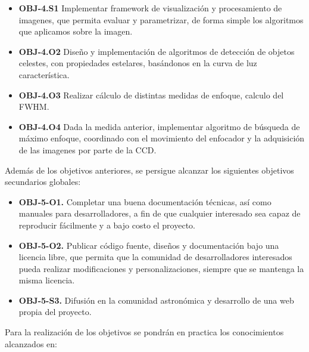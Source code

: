 \begin{itemize}
  \item \textbf{OBJ-4.S1} Implementar framework de visualización y procesamiento de imagenes, que permita evaluar y parametrizar, de forma simple los algoritmos que aplicamos sobre la imagen.
  \item \textbf{OBJ-4.O2} Diseño y implementación de algoritmos de detección de objetos celestes, con propiedades estelares, basándonos en la curva de luz característica.
  \item \textbf{OBJ-4.O3} Realizar cálculo de distintas medidas de enfoque, calculo del FWHM.
  \item \textbf{OBJ-4.O4} Dada la medida anterior, implementar algoritmo de búsqueda de máximo enfoque, coordinado con el movimiento del enfocador y la adquisición de las imagenes por parte de la CCD.

\end{itemize}

\bigskip
Además de los objetivos anteriores, se persigue alcanzar los siguientes objetivos secundarios globales:

\begin{itemize}
  \item \textbf{OBJ-5-O1.} Completar una buena documentación técnicas, así como manuales para desarrolladores, a fin de que cualquier interesado sea capaz de reproducir fácilmente y a bajo costo el proyecto.
  \item \textbf{OBJ-5-O2.} Publicar código fuente, diseños y documentación bajo una licencia libre, que permita que la comunidad de desarrolladores interesados pueda realizar modificaciones y personalizaciones, siempre que se mantenga la misma licencia.
  \item \textbf{OBJ-5-S3.} Difusión en la comunidad astronómica y desarrollo de una web propia del proyecto.

\end{itemize}

\bigskip
Para la realización de los objetivos se pondrán en practica los conocimientos alcanzados en:

